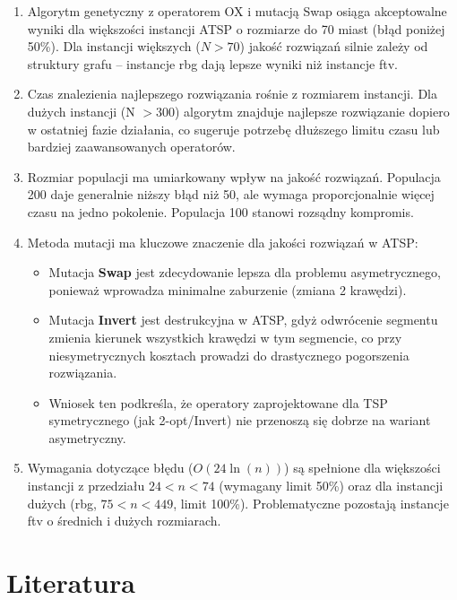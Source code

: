 \documentclass[a4paper,12pt]{article}
\begin{document}
\begin{enumerate}
    \item Algorytm genetyczny z operatorem OX i mutacją Swap osiąga akceptowalne wyniki dla większości instancji 
    ATSP o rozmiarze do 70 miast (błąd poniżej 50\%). Dla instancji większych ($N > 70$) jakość rozwiązań
    silnie zależy od struktury grafu -- instancje rbg dają lepsze wyniki niż instancje ftv.
    
    \item Czas znalezienia najlepszego rozwiązania rośnie z rozmiarem instancji. Dla dużych instancji
    (N $> 300$) algorytm znajduje najlepsze rozwiązanie dopiero w ostatniej fazie działania, co sugeruje
    potrzebę dłuższego limitu czasu lub bardziej zaawansowanych operatorów.
    
    \item Rozmiar populacji ma umiarkowany wpływ na jakość rozwiązań. Populacja 200 daje generalnie
    niższy błąd niż 50, ale wymaga proporcjonalnie więcej czasu na jedno pokolenie. Populacja 100
    stanowi rozsądny kompromis.
    
    \item Metoda mutacji ma kluczowe znaczenie dla jakości rozwiązań w ATSP:
    \begin{itemize}
        \item Mutacja \textbf{Swap} jest zdecydowanie lepsza dla problemu asymetrycznego, ponieważ
        wprowadza minimalne zaburzenie (zmiana 2 krawędzi).
        \item Mutacja \textbf{Invert} jest destrukcyjna w ATSP, gdyż odwrócenie segmentu zmienia
        kierunek wszystkich krawędzi w tym segmencie, co przy niesymetrycznych kosztach prowadzi
        do drastycznego pogorszenia rozwiązania.
        \item Wniosek ten podkreśla, że operatory zaprojektowane dla TSP symetrycznego (jak 2-opt/Invert)
        nie przenoszą się dobrze na wariant asymetryczny.
    \end{itemize}
    
    \item Wymagania dotyczące błędu ($O(24\ln(n))$) są spełnione dla większości instancji z przedziału
    $24 < n < 74$ (wymagany limit 50\%) oraz dla instancji dużych (rbg, $75 < n < 449$, limit 100\%).
    Problematyczne pozostają instancje ftv o średnich i dużych rozmiarach.
\end{enumerate}

\section{Literatura}
\end{document}
